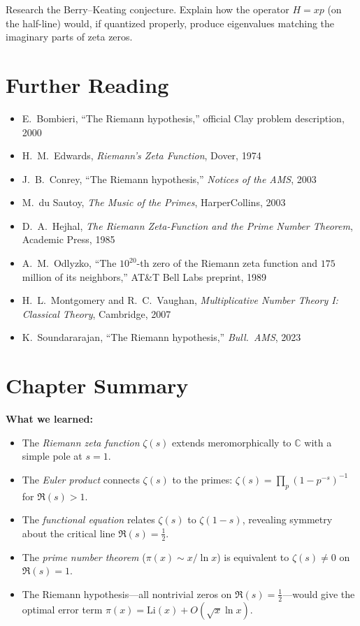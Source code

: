 \begin{exercise}
\label{ex:berry_keating}
Research the Berry--Keating conjecture. Explain how the operator $H = xp$ (on the half-line) would, if quantized properly, produce eigenvalues matching the imaginary parts of zeta zeros.
\end{exercise}

\section{Further Reading}

\begin{itemize}
  \item E.\ Bombieri, ``The Riemann hypothesis,'' official Clay problem description, 2000
  \item H.\ M.\ Edwards, \textit{Riemann's Zeta Function}, Dover, 1974
  \item J.\ B.\ Conrey, ``The Riemann hypothesis,'' \textit{Notices of the AMS}, 2003
  \item M.\ du Sautoy, \textit{The Music of the Primes}, HarperCollins, 2003
  \item D.\ A.\ Hejhal, \textit{The Riemann Zeta-Function and the Prime Number Theorem}, Academic Press, 1985
  \item A.\ M.\ Odlyzko, ``The $10^{20}$-th zero of the Riemann zeta function and $175$ million of its neighbors,'' AT\&T Bell Labs preprint, 1989
  \item H.\ L.\ Montgomery and R.\ C.\ Vaughan, \textit{Multiplicative Number Theory I: Classical Theory}, Cambridge, 2007
  \item K.\ Soundararajan, ``The Riemann hypothesis,'' \textit{Bull.\ AMS}, 2023
\end{itemize}

\section*{Chapter Summary}

\noindent\textbf{What we learned:}
\begin{itemize}
  \item The \emph{Riemann zeta function} $\zeta(s)$ extends meromorphically to $\mathbb{C}$ with a simple pole at $s = 1$.
  \item The \emph{Euler product} connects $\zeta(s)$ to the primes: $\zeta(s) = \prod_p (1 - p^{-s})^{-1}$ for $\Re(s) > 1$.
  \item The \emph{functional equation} relates $\zeta(s)$ to $\zeta(1-s)$, revealing symmetry about the critical line $\Re(s) = \tfrac{1}{2}$.
  \item The \emph{prime number theorem} ($\pi(x) \sim x/\ln x$) is equivalent to $\zeta(s) \neq 0$ on $\Re(s) = 1$.
  \item The Riemann hypothesis---all nontrivial zeros on $\Re(s) = \tfrac{1}{2}$---would give the optimal error term $\pi(x) = \mathrm{Li}(x) + O(\sqrt{x} \ln x)$.
\end{itemize}

